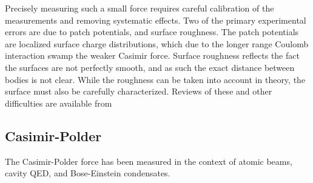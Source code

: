 Precisely measuring such a small force requires careful calibration of the measurements 
and removing systematic effects.  Two of the primary experimental errors are due to 
patch potentials, and surface roughness.  The patch potentials are localized surface 
charge distributions, which due to the longer range Coulomb interaction swamp the weaker
Casimir force.  Surface roughness reflects the fact the surfaces are not perfectly smooth,
and as such the exact distance between bodies is not clear.  While the roughness can be taken into
account in theory, the surface must also be carefully characterized.  Reviews of these and other 
difficulties are available from

\subsection{Casimir-Polder}
The Casimir-Polder force has been measured in the context of atomic beams, cavity QED, and 
Bose-Einstein condensates.  

